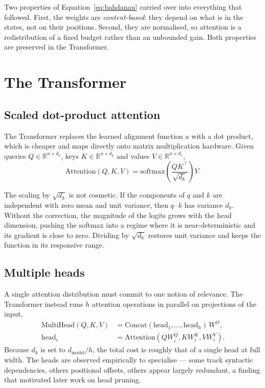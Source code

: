 \documentclass[11pt,a4paper]{article}
\begin{document}
Two properties of Equation~\ref{eq:bahdanau} carried over into everything that
followed. First, the weights are \emph{content-based}: they depend on what is
in the states, not on their positions. Second, they are normalised, so
attention is a redistribution of a fixed budget rather than an unbounded gain.
Both properties are preserved in the Transformer.

\section{The Transformer}
\label{sec:transformer}

\subsection{Scaled dot-product attention}

The Transformer \cite{vaswani2017} replaces the learned alignment function $a$
with a dot product, which is cheaper and maps directly onto matrix
multiplication hardware. Given queries $Q \in \mathbb{R}^{n \times d_k}$, keys
$K \in \mathbb{R}^{n \times d_k}$ and values $V \in \mathbb{R}^{n \times d_v}$,
\begin{equation}
  \mathrm{Attention}(Q, K, V)
    = \mathrm{softmax}\!\left(\frac{QK^{\top}}{\sqrt{d_k}}\right) V.
  \label{eq:attention}
\end{equation}

The scaling by $\sqrt{d_k}$ is not cosmetic. If the components of $q$ and $k$
are independent with zero mean and unit variance, then $q \cdot k$ has
variance $d_k$. Without the correction, the magnitude of the logits grows with
the head dimension, pushing the softmax into a regime where it is
near-deterministic and its gradient is close to zero. Dividing by $\sqrt{d_k}$
restores unit variance and keeps the function in its responsive range.

\subsection{Multiple heads}

A single attention distribution must commit to one notion of relevance. The
Transformer instead runs $h$ attention operations in parallel on projections
of the input,
\begin{align}
  \mathrm{MultiHead}(Q,K,V) &= \mathrm{Concat}(\mathrm{head}_1, \dots,
    \mathrm{head}_h)\, W^O, \\
  \mathrm{head}_i &= \mathrm{Attention}(QW_i^Q, KW_i^K, VW_i^V).
\end{align}
Because $d_k$ is set to $d_{\text{model}} / h$, the total cost is roughly that
of a single head at full width. The heads are observed empirically to
specialise --- some track syntactic dependencies, others positional offsets,
others appear largely redundant, a finding that motivated later work on head
pruning.
\end{document}

